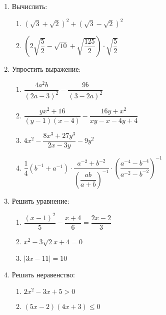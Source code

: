 \documentclass[12pt, a5paper]{article}
\begin{document}
	
\begin{enumerate}
	\item Вычислить:
	\begin{enumerate}
		\item $(\sqrt{3}+\sqrt{2})^2+(\sqrt{3}-\sqrt{2})^2$
		\item $\left(2\sqrt{\dfrac{5}{2}}-\sqrt{10}+\sqrt{\dfrac{125}{2}}\right)\cdot\sqrt{\dfrac{5}{2}}$
	\end{enumerate}
	\item Упростить выражение:
	\begin{enumerate}
		\item $\dfrac{4a^2b}{(2a-3)^2}-\dfrac{9b}{(3-2a)^2}$
		\item $\dfrac{yx^2+16}{(y-1)(x-4)}-\dfrac{16y+x^2}{xy-x-4y+4}$
		\item $4x^2-\dfrac{8x^3+27y^3}{2x-3y}-9y^2$
		\item $\dfrac{1}{4}(b^{-1}+a^{-1})\cdot\dfrac{a^{-2}+b^{-2}}{\left(\dfrac{ab}{a+b}\right)^{-1}}\cdot\left(\dfrac{a^{-4}-b^{-4}}{a^{-2}-b^{-2}}\right)^{-1}$
	\end{enumerate}
	\item Решить уравнение:
	\begin{enumerate}
		\item $\dfrac{(x-1)^2}{5}-\dfrac{x+4}{6}=\dfrac{2x-2}{3}$
		\item $x^2-3\sqrt{2}x+4=0$
		\item $|3x-11|=10$
	\end{enumerate}
	\item Решить неравенство:
	\begin{enumerate}
		\item $2x^2-3x+5>0$
		\item $(5x-2)(4x+3)\leq0$
	\end{enumerate}
\end{enumerate}
\end{document}
